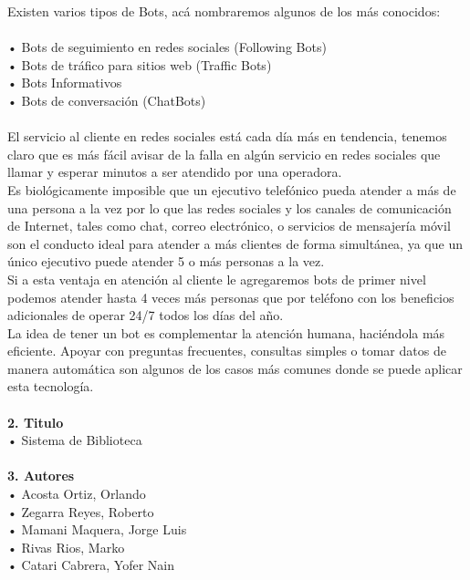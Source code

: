 \begin{flushleft}
\begin{itemize}
Existen varios tipos de Bots, acá nombraremos algunos de los más conocidos: \textbf{ }\\
\textbf{ }\\
•	Bots de seguimiento en redes sociales (Following Bots)\textbf{ }\\
•	Bots de tráfico para sitios web (Traffic Bots)\textbf{ }\\
•	Bots Informativos\textbf{ }\\
•	Bots de conversación (ChatBots)\textbf{ }\\
\textbf{ }\\
El servicio al cliente en redes sociales está cada día más en tendencia, tenemos claro que es más fácil avisar de la falla en algún servicio en redes sociales que llamar y esperar minutos a ser atendido por una operadora.\textbf{ }\\
Es biológicamente imposible que un ejecutivo telefónico pueda atender a más de una persona a la vez por lo que las redes sociales y los canales de comunicación de Internet, tales como chat, correo electrónico, o servicios de mensajería móvil son el conducto ideal para atender a más clientes de forma simultánea, ya que un único ejecutivo puede atender 5 o más personas a la vez.\textbf{ }\\
Si a esta ventaja en atención al cliente le agregaremos bots de primer nivel podemos atender hasta 4 veces más personas que por teléfono con los beneficios adicionales de operar 24/7 todos los días del año.\textbf{ }\\
La idea de tener un bot es complementar la atención humana, haciéndola más eficiente. Apoyar con preguntas frecuentes, consultas simples o tomar datos de manera automática son algunos de los casos más comunes donde se puede aplicar esta tecnología.\textbf{ }\\
\textbf{ }\\
\textbf{2.	Titulo}\\
•         Sistema de Biblioteca
\textbf{ }\\
\textbf{ }\\
\textbf{3.	Autores}\\
•	Acosta Ortiz, Orlando \textbf{ }\\
•	Zegarra Reyes, Roberto\textbf{ }\\
•	Mamani Maquera, Jorge Luis\textbf{ }\\
•	Rivas Rios, Marko\textbf{ }\\
•	Catari Cabrera, Yofer Nain\textbf{ }\\


\end{itemize}
\end{flushleft}
